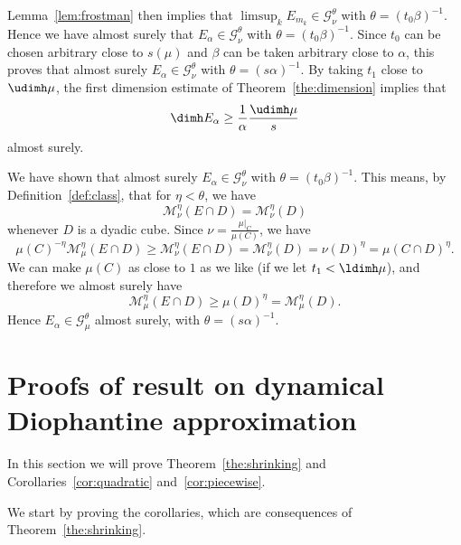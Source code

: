 Lemma~\ref{lem:frostman} then implies that $\limsup_k E_{m_k} \in
\mathscr{G}_\nu^\theta$ with $\theta = (t_0 \beta)^{-1}$. Hence we have almost surely that $E_\alpha \in \mathscr{G}_\nu^\theta$ with $\theta = (t_0 \beta)^{-1}$. Since $t_0$ can be chosen arbitrary close to $s (\mu)$ and $\beta$ can be taken arbitrary close to $\alpha$, this proves that almost surely $E_\alpha \in
\mathscr{G}_\nu^\theta$ with $\theta = (s \alpha)^{-1}$. By taking $t_1$ close to $\udimh \mu$, the first dimension estimate of Theorem~\ref{the:dimension} implies that
\[
\dimh E_\alpha \geq \frac{1}{\alpha} \frac{\udimh \mu}{s}
\]
almost surely.

We have shown that almost surely $E_\alpha \in \mathscr{G}_\nu^\theta$ with $\theta = (t_0 \beta)^{-1}$. This means, by Definition~\ref{def:class}, that for $\eta < \theta$, we have
\[
\mathscr{M}_\nu^\eta (E \cap D) = \mathscr{M}_\nu^\eta (D)
\]
whenever $D$ is a dyadic cube. Since $\nu = \frac{\mu|_C}{\mu(C)}$, we have
\[
\mu (C)^{-\eta} \mathscr{M}_\mu^\eta (E \cap D) \geq \mathscr{M}_\nu^\eta (E \cap D) = \mathscr{M}_\nu^\eta (D) = \nu (D)^\eta = \mu(C \cap D)^\eta.
\]
We can make $\mu(C)$ as close to $1$ as we like (if we let $t_1 <
\ldimh \mu$), and therefore we almost surely have
\[
\mathscr{M}_\mu^\eta (E \cap D) \geq \mu(D)^\eta =
\mathscr{M}_\mu^\eta (D).
\]
Hence $E_\alpha \in \mathscr{G}_\mu^\theta$ almost surely, with $\theta = (s \alpha)^{-1}$.



\section{Proofs of result on dynamical Diophantine approximation} \label{sec:shrinkingproofs}

In this section we will prove Theorem~\ref{the:shrinking} and Corollaries~\ref{cor:quadratic} and~\ref{cor:piecewise}.

We start by proving the corollaries, which are consequences of Theorem~\ref{the:shrinking}.


